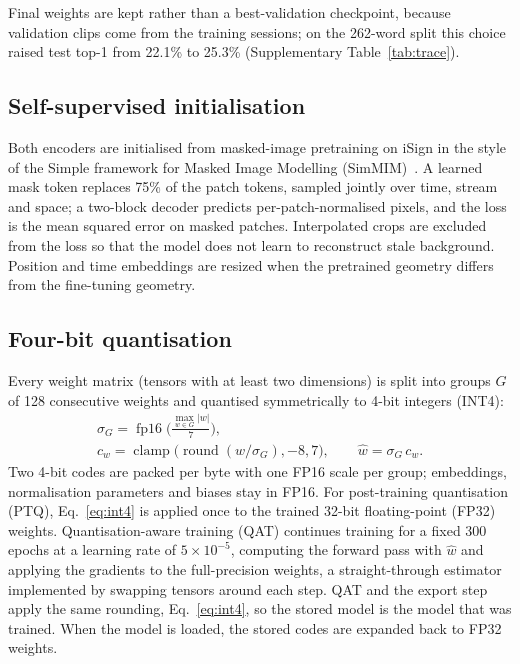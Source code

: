 \documentclass[pdflatex,sn-mathphys-num,twocolumn,lineno]{sn-jnl}
\theoremstyle{thmstyleone}%
\begin{document}
Final weights are kept rather than a best-validation checkpoint, because validation clips come from the training sessions; on the 262-word split this choice raised test top-1 from 22.1\% to 25.3\% (Supplementary Table~\ref{tab:trace}).

\subsection{Self-supervised initialisation}\label{sec:method:ssl}
Both encoders are initialised from masked-image pretraining on iSign in the style of the Simple framework for Masked Image Modelling (SimMIM)~\cite{xie2022simmim}. A learned mask token replaces 75\% of the patch tokens, sampled jointly over time, stream and space; a two-block decoder predicts per-patch-normalised pixels, and the loss is the mean squared error on masked patches. Interpolated crops are excluded from the loss so that the model does not learn to reconstruct stale background. Position and time embeddings are resized when the pretrained geometry differs from the fine-tuning geometry.

\subsection{Four-bit quantisation}\label{sec:method:quant}
Every weight matrix (tensors with at least two dimensions) is split into groups $G$ of 128 consecutive weights and quantised symmetrically to 4-bit integers (INT4):
\begin{equation}
\begin{gathered}\sigma_G=\operatorname{fp16}\!\Big(\frac{\max_{w\in G}|w|}{7}\Big),\\ c_w=\operatorname{clamp}\big(\operatorname{round}(w/\sigma_G),-8,7\big),\qquad \hat{w}=\sigma_G\,c_w.\end{gathered}\label{eq:int4}
\end{equation}
Two 4-bit codes are packed per byte with one FP16 scale per group; embeddings, normalisation parameters and biases stay in FP16. For post-training quantisation (PTQ), Eq.~\eqref{eq:int4} is applied once to the trained 32-bit floating-point (FP32) weights. Quantisation-aware training (QAT) continues training for a fixed 300 epochs at a learning rate of $5\times10^{-5}$, computing the forward pass with $\hat{w}$ and applying the gradients to the full-precision weights, a straight-through estimator~\cite{bengio2013ste,jacob2018quant} implemented by swapping tensors around each step. QAT and the export step apply the same rounding, Eq.~\eqref{eq:int4}, so the stored model is the model that was trained. When the model is loaded, the stored codes are expanded back to FP32 weights.
\end{document}
